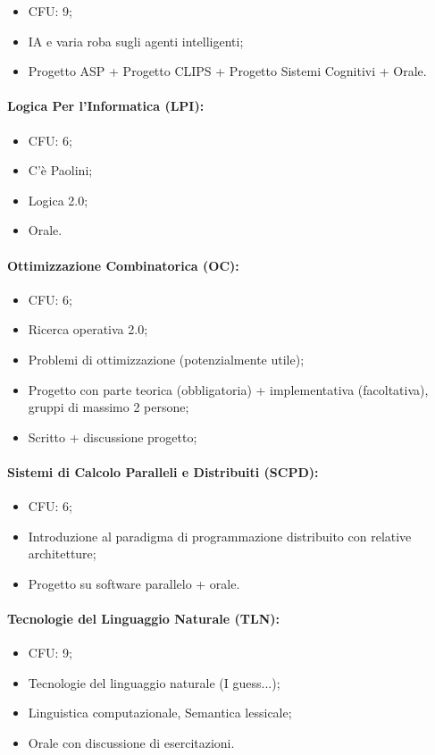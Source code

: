 \begin{itemize}
  \item CFU: 9;
  \item IA e varia roba sugli agenti intelligenti;
  \item Progetto ASP + Progetto CLIPS + Progetto Sistemi Cognitivi + Orale.
\end{itemize}

\paragraph{Logica Per l'Informatica (LPI):}

\begin{itemize}
  \item CFU: 6;
  \item C'è Paolini;
  \item Logica 2.0;
  \item Orale.
\end{itemize}

\paragraph{Ottimizzazione Combinatorica (OC):}

\begin{itemize}
  \item CFU: 6;
  \item Ricerca operativa 2.0;
  \item Problemi di ottimizzazione (potenzialmente utile);
  \item Progetto con parte teorica (obbligatoria) + implementativa (facoltativa), gruppi di massimo 2 persone;
  \item Scritto + discussione progetto;
\end{itemize}

\paragraph{Sistemi di Calcolo Paralleli e Distribuiti (SCPD):}

\begin{itemize}
  \item CFU: 6;
  \item Introduzione al paradigma di programmazione distribuito con relative architetture;
  \item Progetto su software parallelo + orale.
\end{itemize}

\paragraph{Tecnologie del Linguaggio Naturale (TLN):}

\begin{itemize}
  \item CFU: 9;
  \item Tecnologie del linguaggio naturale (I guess...);
  \item Linguistica computazionale, Semantica lessicale;
  \item Orale con discussione di esercitazioni.
\end{itemize}
